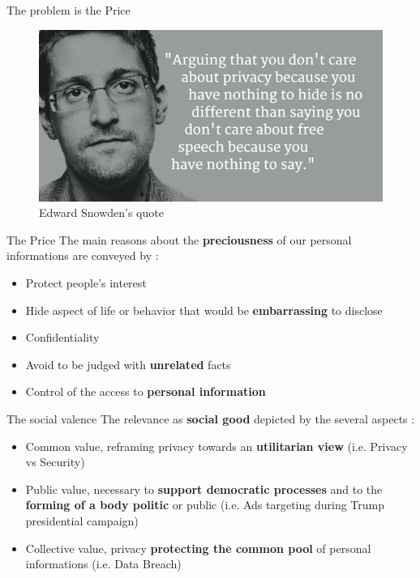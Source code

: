 \documentclass[11pt, british]{beamer}
\begin{document}
		\begin{frame}{The problem is the Price}
			\begin{figure}
				\includegraphics[width=\linewidth]{Imgs/snowden.png}
				\caption{Edward Snowden's quote}
			\end{figure}
		\end{frame}
		
		\begin{frame}{The Price}
			The main reasons about the \textbf{preciousness} of our personal 
			informations are 
			conveyed by \parencite{5} :
			\begin{itemize}
				\item Protect \alert{people's interest}
				\item \alert{Hide aspect of life} or behavior that would be 
				\textbf{embarrassing} to disclose
				\item \alert{Confidentiality}
				\item \alert{Avoid to be judged} with \textbf{unrelated} facts
				\item \alert{Control} of the access to \textbf{personal 
				information}
			\end{itemize}
		\end{frame}
		
		\begin{frame}{The social valence}
			The relevance as \textbf{social good} depicted by the several 
			aspects \parencite{6} :
			\begin{itemize}
				\item \alert{Common value}, reframing privacy towards an
				\textbf{utilitarian view} (i.e. Privacy vs Security)
				\item \alert{Public value}, necessary to \textbf{support 
				democratic 
				processes} and to the \textbf{forming of a body politic} or 
				public (i.e. Ads targeting during Trump presidential campaign)
				\item \alert{Collective value}, privacy \textbf{protecting the 
				common pool} of personal informations (i.e. Data Breach)  
			\end{itemize}
		\end{frame}
		
\end{document}

